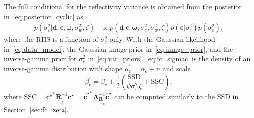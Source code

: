 \documentclass[12pt]{article}
\newcommand{\mybcirc}[1] {\underline{\underline{\bm{#1}}}}
\begin{document}
The full conditional for the reflectivity variance is obtained from the posterior in~\eqref{eq:posterior_cyclic} as
\begin{equation} \label{eq:fc_sigmac}
    \begin{split}
        p(\sigma_c^2| \bm{d}, \bm{c}, \bm{\omega}, \sigma_w^2, \zeta)
        &\propto p(\bm{d}| \bm{c}, \bm{\omega}, \sigma_c^2, \sigma_w^2, \zeta) p(\bm{c}| \sigma_c^2) p(\sigma_c^2),
    \end{split}
\end{equation}
where the RHS is a function of $\sigma_c^2$ only. 
With the Gaussian likelihood in~\eqref{eq:data_model}, the Gaussian image prior in~\eqref{eq:image_prior}, and the inverse-gamma prior for $\sigma_c^2$ in~\eqref{eq:var_priors}, \eqref{eq:fc_sigmac} is the density of an inverse-gamma distribution with shape $\alpha_c^{\prime} = \alpha_c + n$ and scale 
\begin{equation}
    \beta_c^{\prime} = \beta_c + \frac{1}{2}\left(\frac{\mbox{SSD}}{\psi \sigma_w^2 \zeta} + \mbox{SSC}\right),
\end{equation} 
where $\mbox{SSC} = \bm{c}^{\star^{\top}} \mybcirc{R}_c^{-1} \bm{c}^{\star} = \hat{\bm{c}}^{\star^{H}}\bm{\Lambda}_{\mybcirc{R}_{c}}^{-1} \hat{\bm{c}}^{\star}$ can be computed similarly to the SSD in Section~\ref{sec:fc_zeta}.


\end{document}
